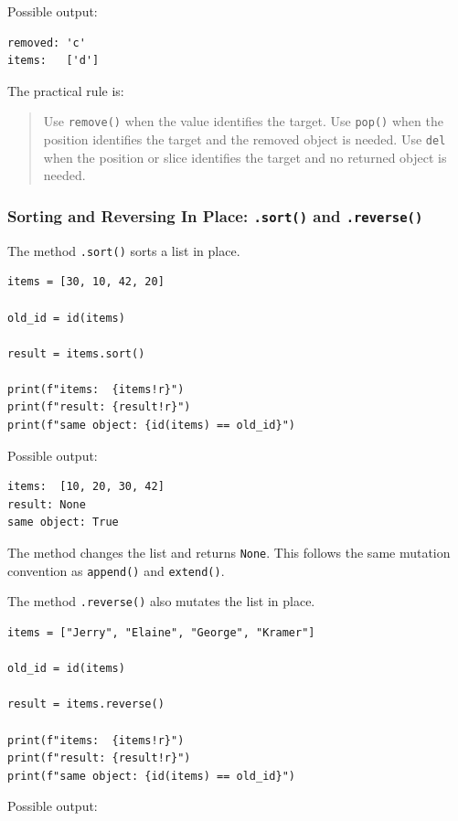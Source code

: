 Possible output:

\begin{verbatim}
removed: 'c'
items:   ['d']
\end{verbatim}

The practical rule is:

\begin{quote}
Use \texttt{remove()} when the value identifies the target. Use \texttt{pop()} when the position identifies the target and the removed object is needed. Use \texttt{del} when the position or slice identifies the target and no returned object is needed.
\end{quote}

\subsubsection{Sorting and Reversing In Place: \texttt{.sort()} and \texttt{.reverse()}}

The method \texttt{.sort()} sorts a list in place.

\begin{verbatim}
items = [30, 10, 42, 20]

old_id = id(items)

result = items.sort()

print(f"items:  {items!r}")
print(f"result: {result!r}")
print(f"same object: {id(items) == old_id}")
\end{verbatim}

Possible output:

\begin{verbatim}
items:  [10, 20, 30, 42]
result: None
same object: True
\end{verbatim}

The method changes the list and returns \texttt{None}. This follows the same mutation convention as \texttt{append()} and \texttt{extend()}.

The method \texttt{.reverse()} also mutates the list in place.

\begin{verbatim}
items = ["Jerry", "Elaine", "George", "Kramer"]

old_id = id(items)

result = items.reverse()

print(f"items:  {items!r}")
print(f"result: {result!r}")
print(f"same object: {id(items) == old_id}")
\end{verbatim}

Possible output:

